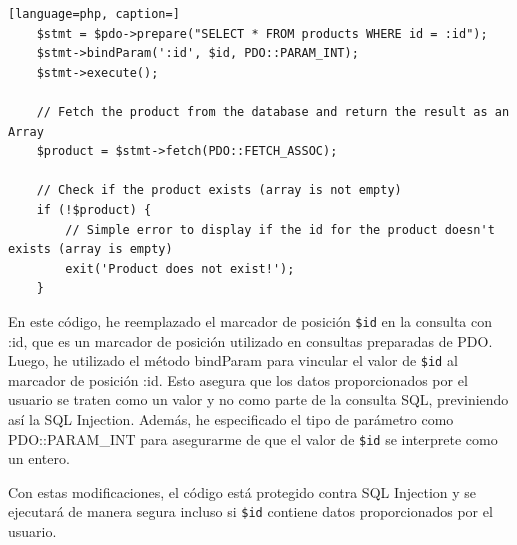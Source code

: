 \documentclass[a4paper]{article} %
\begin{document}
    \vspace{0.3cm}

    \begin{lstlisting}[language=php, caption=]
    $stmt = $pdo->prepare("SELECT * FROM products WHERE id = :id");
    $stmt->bindParam(':id', $id, PDO::PARAM_INT);
    $stmt->execute();

    // Fetch the product from the database and return the result as an Array
    $product = $stmt->fetch(PDO::FETCH_ASSOC);

    // Check if the product exists (array is not empty)
    if (!$product) {
        // Simple error to display if the id for the product doesn't exists (array is empty)
        exit('Product does not exist!');
    }
    \end{lstlisting}

    En este código, he reemplazado el marcador de posición \texttt{\$id} en la consulta con :id, que es un marcador de posición utilizado en consultas preparadas de PDO. Luego, he utilizado el método bindParam para vincular el valor de \texttt{\$id} al marcador de posición :id. Esto asegura que los datos proporcionados por el usuario se traten como un valor y no como parte de la consulta SQL, previniendo así la SQL Injection. Además, he especificado el tipo de parámetro como PDO::PARAM\_INT para asegurarme de que el valor de \texttt{\$id} se interprete como un entero.

    Con estas modificaciones, el código está protegido contra SQL Injection y se ejecutará de manera segura incluso si \texttt{\$id} contiene datos proporcionados por el usuario.

    \clearpage
\end{document}
